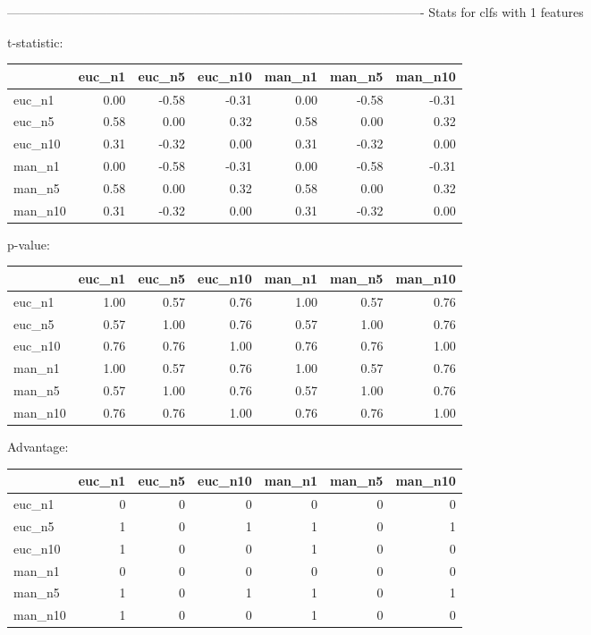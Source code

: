----------------------------------------------------------------------------------------------------
Stats for clfs with 1 features


t-statistic:
 \begin{tabular}{lrrrrrr}
\hline
         &   euc\_n1 &   euc\_n5 &   euc\_n10 &   man\_n1 &   man\_n5 &   man\_n10 \\
\hline
 euc\_n1  &     0.00 &    -0.58 &     -0.31 &     0.00 &    -0.58 &     -0.31 \\
 euc\_n5  &     0.58 &     0.00 &      0.32 &     0.58 &     0.00 &      0.32 \\
 euc\_n10 &     0.31 &    -0.32 &      0.00 &     0.31 &    -0.32 &      0.00 \\
 man\_n1  &     0.00 &    -0.58 &     -0.31 &     0.00 &    -0.58 &     -0.31 \\
 man\_n5  &     0.58 &     0.00 &      0.32 &     0.58 &     0.00 &      0.32 \\
 man\_n10 &     0.31 &    -0.32 &      0.00 &     0.31 &    -0.32 &      0.00 \\
\hline
\end{tabular} 

p-value:
 \begin{tabular}{lrrrrrr}
\hline
         &   euc\_n1 &   euc\_n5 &   euc\_n10 &   man\_n1 &   man\_n5 &   man\_n10 \\
\hline
 euc\_n1  &     1.00 &     0.57 &      0.76 &     1.00 &     0.57 &      0.76 \\
 euc\_n5  &     0.57 &     1.00 &      0.76 &     0.57 &     1.00 &      0.76 \\
 euc\_n10 &     0.76 &     0.76 &      1.00 &     0.76 &     0.76 &      1.00 \\
 man\_n1  &     1.00 &     0.57 &      0.76 &     1.00 &     0.57 &      0.76 \\
 man\_n5  &     0.57 &     1.00 &      0.76 &     0.57 &     1.00 &      0.76 \\
 man\_n10 &     0.76 &     0.76 &      1.00 &     0.76 &     0.76 &      1.00 \\
\hline
\end{tabular} 

Advantage:
 \begin{tabular}{lrrrrrr}
\hline
         &   euc\_n1 &   euc\_n5 &   euc\_n10 &   man\_n1 &   man\_n5 &   man\_n10 \\
\hline
 euc\_n1  &        0 &        0 &         0 &        0 &        0 &         0 \\
 euc\_n5  &        1 &        0 &         1 &        1 &        0 &         1 \\
 euc\_n10 &        1 &        0 &         0 &        1 &        0 &         0 \\
 man\_n1  &        0 &        0 &         0 &        0 &        0 &         0 \\
 man\_n5  &        1 &        0 &         1 &        1 &        0 &         1 \\
 man\_n10 &        1 &        0 &         0 &        1 &        0 &         0 \\
\hline
\end{tabular} 

